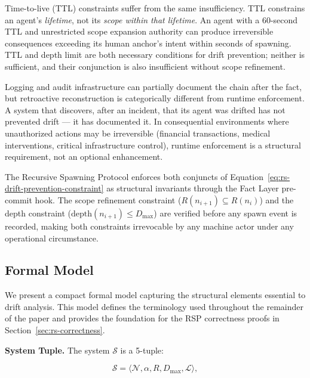 Time-to-live (TTL) constraints suffer from the same insufficiency. TTL constrains an agent's \emph{lifetime}, not its \emph{scope within that lifetime}. An agent with a 60-second TTL and unrestricted scope expansion authority can produce irreversible consequences exceeding its human anchor's intent within seconds of spawning. TTL and depth limit are both necessary conditions for drift prevention; neither is sufficient, and their conjunction is also insufficient without scope refinement.

Logging and audit infrastructure can partially document the chain after the fact, but retroactive reconstruction is categorically different from runtime enforcement. A system that discovers, after an incident, that its agent was drifted has not prevented drift — it has documented it. In consequential environments where unauthorized actions may be irreversible (financial transactions, medical interventions, critical infrastructure control), runtime enforcement is a structural requirement, not an optional enhancement.

The Recursive Spawning Protocol enforces both conjuncts of Equation~\ref{eq:rs-drift-prevention-constraint} as structural invariants through the Fact Layer pre-commit hook. The scope refinement constraint ($R(n_{i+1}) \subseteq R(n_i)$) and the depth constraint ($\mathrm{depth}(n_{i+1}) \leq D_{\max}$) are verified before any spawn event is recorded, making both constraints irrevocable by any machine actor under any operational circumstance.

\subsection{Formal Model}
\label{sec:rs-drift-model}

We present a compact formal model capturing the structural elements essential to drift analysis. This model defines the terminology used throughout the remainder of the paper and provides the foundation for the RSP correctness proofs in Section~\ref{sec:rs-correctness}.

\medskip
\noindent\textbf{System Tuple.}
The system $\mathcal{S}$ is a 5-tuple:

\begin{equation}
\mathcal{S} = \langle \mathcal{N}, \alpha, R, D_{\max}, \mathcal{L} \rangle,
\label{eq:rs-system-model}
\end{equation}

